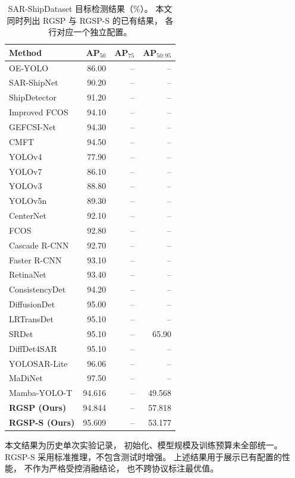 \documentclass[journal]{IEEEtran}
\begin{document}
\begin{table}[!tbp]
\centering
\small
\setlength{\tabcolsep}{3pt}
\caption{SAR-ShipDataset 目标检测结果（\%）。
本文同时列出 RGSP 与 RGSP-S 的已有结果，
各行对应一个独立配置。}
\label{tab:sar_ship_comparison}
\begin{tabular*}{\linewidth}{@{\extracolsep{\fill}}lrrr}
\toprule
Method & AP$_{50}$ & AP$_{75}$ & AP$_{50:95}$ \\
\midrule
OE-YOLO           & 86.00 & -- & --    \\
SAR-ShipNet       & 90.20 & -- & --    \\
ShipDetector      & 91.20 & -- & --    \\
Improved FCOS     & 94.10 & -- & --    \\
GEFCSI-Net        & 94.30 & -- & --    \\
CMFT              & 94.50 & -- & --    \\
YOLOv4            & 77.90 & -- & --    \\
YOLOv7            & 86.10 & -- & --    \\
YOLOv3            & 88.80 & -- & --    \\
YOLOv5n           & 89.30 & -- & --    \\
CenterNet         & 92.10 & -- & --    \\
FCOS              & 92.80 & -- & --    \\
Cascade R-CNN     & 92.70 & -- & --    \\
Faster R-CNN      & 93.10 & -- & --    \\
RetinaNet         & 93.40 & -- & --    \\
ConsistencyDet    & 94.20 & -- & --    \\
DiffusionDet      & 95.00 & -- & --    \\
LRTransDet        & 95.10 & -- & --    \\
SRDet             & 95.10 & -- & 65.90 \\
DiffDet4SAR       & 95.10 & -- & --    \\
YOLOSAR-Lite      & 96.06 & -- & --    \\
MaDiNet           & 97.50 & -- & --    \\
\midrule
Mamba-YOLO-T      & 94.616 & -- & 49.568 \\
\textbf{RGSP (Ours)}
                  & 94.844 & -- & 57.818 \\
\textbf{RGSP-S (Ours)}
                  & 95.609 & -- & 53.177 \\
\bottomrule
\end{tabular*}

\smallskip
\begin{minipage}{\linewidth}
\footnotesize
本文结果为历史单次实验记录，
初始化、模型规模及训练预算未全部统一。
RGSP-S 采用标准推理，不包含测试时增强。
上述结果用于展示已有配置的性能，
不作为严格受控消融结论，
也不跨协议标注最优值。
\end{minipage}
\end{table}
\end{document}
